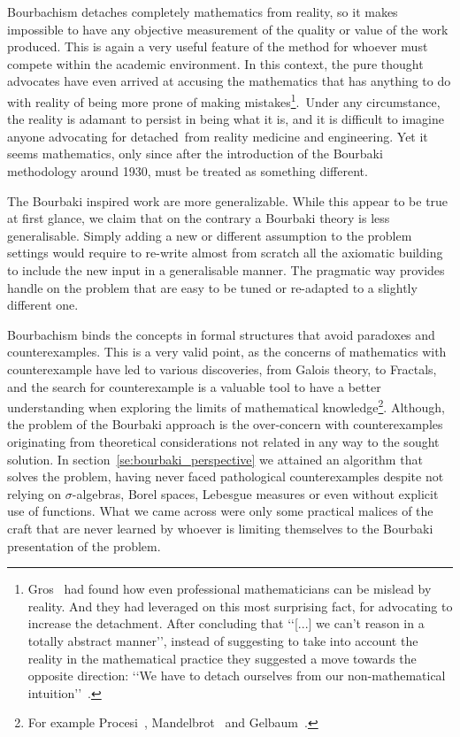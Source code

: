 \documentclass[]{scrartcl}
\theoremstyle{definition}
\begin{document}
Bourbachism detaches completely mathematics from reality, so it makes impossible to have any objective measurement of the quality or value of the work produced. This is again a very useful feature of the method for whoever must compete within the academic environment. In this context, the pure thought advocates have even arrived at accusing the mathematics that has anything to do with reality of being more prone of making mistakes\footnote{
    Gros~\cite{gros2019masters} had found how even professional mathematicians can be mislead by reality. And they had leveraged on this most surprising fact, for advocating to increase the detachment. After concluding that \lq\lq [...] we can't reason in a totally abstract manner\rq\rq, instead of suggesting to take into account the reality in the mathematical practice they suggested a move towards the opposite direction: \lq\lq We have to detach ourselves from our non-mathematical intuition\rq\rq~\cite{gros2019sciencedaily}.
}. Under any circumstance, the reality is adamant to persist in being what it is, and it is difficult to imagine anyone advocating for detached from reality medicine and engineering. Yet it seems mathematics, only since after the introduction of the Bourbaki methodology around 1930, must be treated as something different.

The Bourbaki inspired work are more generalizable. While this appear to be true at first glance, we claim that on the contrary a Bourbaki theory is less generalisable. Simply adding a new or different assumption to the problem settings would require to re-write almost from scratch all the axiomatic building to include the new input in a generalisable manner. The pragmatic way provides handle on the problem that are easy to be tuned or re-adapted to a slightly different one. 

Bourbachism binds the concepts in formal structures that avoid paradoxes and counterexamples. This is a very valid point, as the concerns of mathematics with counterexample have led to various discoveries, from Galois theory, to Fractals, and the search for counterexample is a valuable tool to have a better understanding when exploring the limits of mathematical knowledge\footnote{
    For example Procesi~\cite{procesi1977elementi}, Mandelbrot~\cite{mandelbrot1983fractal} and Gelbaum~\cite{gelbaum2003counterexamples}.
}. Although, the problem of the Bourbaki approach is the over-concern with counterexamples originating from theoretical considerations not related in any way to the sought solution. In section~\ref{se:bourbaki_perspective} we attained an algorithm that solves the problem, having never faced pathological counterexamples despite not relying on $\sigma$-algebras, Borel spaces, Lebesgue measures or even without explicit use of functions. What we came across were only some practical malices of the craft that are never learned by whoever is limiting themselves to the Bourbaki presentation of the problem.
\end{document}
